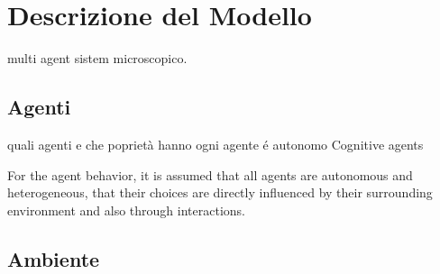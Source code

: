 \section{Descrizione del Modello}

multi agent sistem microscopico.

\subsection{Agenti}
quali agenti e che poprietà hanno
ogni agente é autonomo Cognitive agents


For the agent behavior, it is
assumed that all agents are autonomous and heterogeneous, that their choices are directly
influenced by their surrounding environment and also through interactions.

\subsection{Ambiente}
